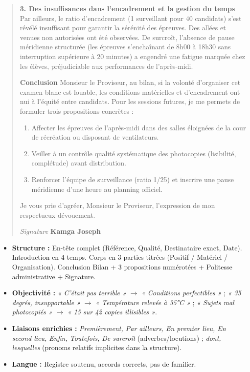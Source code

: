 \documentclass[11pt]{article}
\begin{document}
\begin{exemplebox}
\begin{quote}
\textbf{3. Des insuffisances dans l'encadrement et la gestion du temps}
Par ailleurs, le ratio d'encadrement (1 surveillant pour 40 candidats) s'est révélé insuffisant pour garantir la sérénité des épreuves. Des allées et venues non autorisées ont été observées. De surcroît, l'absence de pause méridienne structurée (les épreuves s'enchaînant de 8h00 à 18h30 sans interruption supérieure à 20 minutes) a engendré une fatigue marquée chez les élèves, préjudiciable aux performances de l'après-midi.

\textbf{Conclusion}
Monsieur le Proviseur, au bilan, si la volonté d'organiser cet examen blanc est louable, les conditions matérielles et d'encadrement ont nui à l'équité entre candidats. Pour les sessions futures, je me permets de formuler trois propositions concrètes :
\begin{enumerate}
    \item Affecter les épreuves de l'après-midi dans des salles éloignées de la cour de récréation ou disposant de ventilateurs.
    \item Veiller à un contrôle qualité systématique des photocopies (lisibilité, complétude) avant distribution.
    \item Renforcer l'équipe de surveillance (ratio 1/25) et inscrire une pause méridienne d'une heure au planning officiel.
\end{enumerate}
Je vous prie d'agréer, Monsieur le Proviseur, l'expression de mon respectueux dévouement.

\textit{Signature}
\textbf{Kamga Joseph}
\end{quote}
\end{exemplebox}

\begin{aretenir}
\begin{itemize}
    \item \textbf{Structure :} En-tête complet (Référence, Qualité, Destinataire exact, Date). Introduction en 4 temps. Corps en 3 parties titrées (Positif / Matériel / Organisation). Conclusion Bilan + 3 propositions numérotées + Politesse administrative + Signature.
    \item \textbf{Objectivité :} \emph{« C'était pas terrible »} $\to$ \emph{« Conditions perfectibles »} ; \emph{« 35 degrés, insupportable »} $\to$ \emph{« Température relevée à 35°C »} ; \emph{« Sujets mal photocopiés »} $\to$ \emph{« 15 sur 42 copies illisibles »}.
    \item \textbf{Liaisons enrichies :} \emph{Premièrement, Par ailleurs, En premier lieu, En second lieu, Enfin, Toutefois, De surcroît} (adverbes/locutions) ; \emph{dont, lesquelles} (pronoms relatifs implicites dans la structure).
    \item \textbf{Langue :} Registre soutenu, accords corrects, pas de familier.
\end{itemize}
\end{aretenir}
\end{document}
